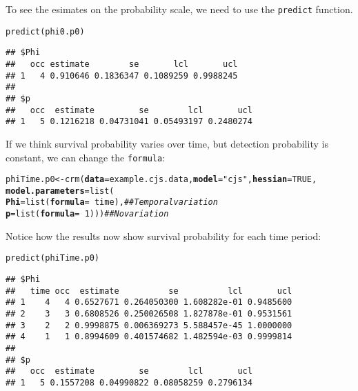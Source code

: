 \documentclass[12pt]{article}\usepackage[]{graphicx}\usepackage[]{color}
\makeatletter
\newcommand{\hlnum}[1]{\textcolor[rgb]{0.69,0.494,0}{#1}}%
\newcommand{\hlstr}[1]{\textcolor[rgb]{0.749,0.012,0.012}{#1}}%
\newcommand{\hlcom}[1]{\textcolor[rgb]{0.514,0.506,0.514}{\textit{#1}}}%
\newcommand{\hlopt}[1]{\textcolor[rgb]{0,0,0}{#1}}%
\newcommand{\hlstd}[1]{\textcolor[rgb]{0,0,0}{#1}}%
\newcommand{\hlkwb}[1]{\textcolor[rgb]{0,0.341,0.682}{#1}}%
\newcommand{\hlkwc}[1]{\textcolor[rgb]{0,0,0}{\textbf{#1}}}%
\newcommand{\hlkwd}[1]{\textcolor[rgb]{0.004,0.004,0.506}{#1}}%
\newenvironment{kframe}{%
 \def\at@end@of@kframe{}%
 \ifinner\ifhmode%
  \def\at@end@of@kframe{\end{minipage}}%
  \begin{minipage}{\columnwidth}%
 \fi\fi%
 \def\FrameCommand##1{\hskip\@totalleftmargin \hskip-\fboxsep
 \colorbox{shadecolor}{##1}\hskip-\fboxsep
     \hskip-\linewidth \hskip-\@totalleftmargin \hskip\columnwidth}%
 \MakeFramed {\advance\hsize-\width
   \@totalleftmargin\z@ \linewidth\hsize
   \@setminipage}}%
 {\par\unskip\endMakeFramed%
 \at@end@of@kframe}
\newenvironment{knitrout}{}{} %
\newcommand{\inr}[1]{\colorbox{inlinecolor}{\texttt{#1}}}
\makeatother
\begin{document}
To see the esimates on the probability scale, we need to use the
\inr{predict} function.

\begin{knitrout}
\color{fgcolor}\begin{kframe}
\begin{alltt}
\hlkwd{predict}\hlstd{(phi0.p0)}
\end{alltt}
\begin{verbatim}
## $Phi
##   occ estimate        se       lcl       ucl
## 1   4 0.910646 0.1836347 0.1089259 0.9988245
## 
## $p
##   occ  estimate         se        lcl       ucl
## 1   5 0.1216218 0.04731041 0.05493197 0.2480274
\end{verbatim}
\end{kframe}
\end{knitrout}


If we think survival probability varies over time, but detection
probability is constant, we can change the \texttt{formula}:


\begin{knitrout}
\color{fgcolor}\begin{kframe}
\begin{alltt}
\hlstd{phiTime.p0} \hlkwb{<-} \hlkwd{crm}\hlstd{(}\hlkwc{data}\hlstd{=example.cjs.data,} \hlkwc{model}\hlstd{=}\hlstr{"cjs"}\hlstd{,} \hlkwc{hessian}\hlstd{=}\hlnum{TRUE}\hlstd{,}
                  \hlkwc{model.parameters}\hlstd{=}\hlkwd{list}\hlstd{(}
                      \hlkwc{Phi}\hlstd{=}\hlkwd{list}\hlstd{(}\hlkwc{formula}\hlstd{=}\hlopt{~}\hlstd{time),}  \hlcom{## Temporal variation}
                      \hlkwc{p}\hlstd{=}\hlkwd{list}\hlstd{(}\hlkwc{formula}\hlstd{=}\hlopt{~}\hlnum{1}\hlstd{)))}      \hlcom{## No variation}
\end{alltt}
\end{kframe}
\end{knitrout}

Notice how the results now show survival probability for each time period:

\begin{knitrout}
\color{fgcolor}\begin{kframe}
\begin{alltt}
\hlkwd{predict}\hlstd{(phiTime.p0)}
\end{alltt}
\begin{verbatim}
## $Phi
##   time occ  estimate          se          lcl       ucl
## 1    4   4 0.6527671 0.264050300 1.608282e-01 0.9485600
## 2    3   3 0.6808526 0.250026508 1.827878e-01 0.9531561
## 3    2   2 0.9998875 0.006369273 5.588457e-45 1.0000000
## 4    1   1 0.8994609 0.401574682 1.482594e-03 0.9999814
## 
## $p
##   occ  estimate         se        lcl       ucl
## 1   5 0.1557208 0.04990822 0.08058259 0.2796134
\end{verbatim}
\end{kframe}
\end{knitrout}
\end{document}
